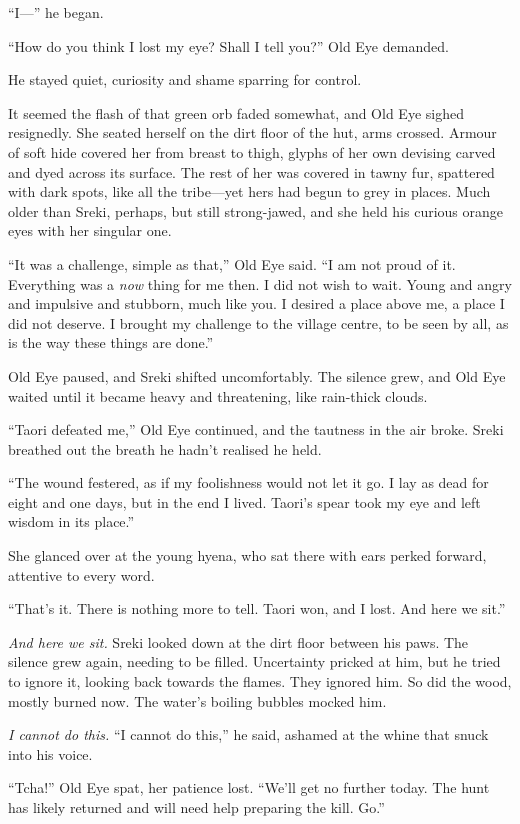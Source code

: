 ``I---'' he began.

``How do you think I lost my eye? Shall I tell you?'' Old Eye demanded.

He stayed quiet, curiosity and shame sparring for control.

It seemed the flash of that green orb faded somewhat, and Old Eye sighed resignedly. She seated herself on the dirt floor of the hut, arms crossed. Armour of soft hide covered her from breast to thigh, glyphs of her own devising carved and dyed across its surface. The rest of her was covered in tawny fur, spattered with dark spots, like all the tribe---yet hers had begun to grey in places. Much older than Sreki, perhaps, but still strong-jawed, and she held his curious orange eyes with her singular one.

``It was a challenge, simple as that,'' Old Eye said. ``I am not proud of it. Everything was a \emph{now} thing for me then. I did not wish to wait. Young and angry and impulsive and stubborn, much like you. I desired a place above me, a place I did not deserve. I brought my challenge to the village centre, to be seen by all, as is the way these things are done.''

Old Eye paused, and Sreki shifted uncomfortably. The silence grew, and Old Eye waited until it became heavy and threatening, like rain-thick clouds.

``Taori defeated me,'' Old Eye continued, and the tautness in the air broke. Sreki breathed out the breath he hadn't realised he held.

``The wound festered, as if my foolishness would not let it go. I lay as dead for eight and one days, but in the end I lived. Taori's spear took my eye and left wisdom in its place.''

She glanced over at the young hyena, who sat there with ears perked forward, attentive to every word.

``That's it. There is nothing more to tell. Taori won, and I lost. And here we sit.''

\emph{And here we sit.} Sreki looked down at the dirt floor between his paws. The silence grew again, needing to be filled. Uncertainty pricked at him, but he tried to ignore it, looking back towards the flames. They ignored him. So did the wood, mostly burned now. The water's boiling bubbles mocked him.

\emph{I cannot do this.} ``I cannot do this,'' he said, ashamed at the whine that snuck into his voice.

``Tcha!'' Old Eye spat, her patience lost. ``We'll get no further today. The hunt has likely returned and will need help preparing the kill. Go.''

